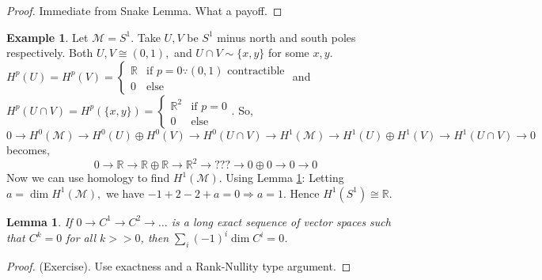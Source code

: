 \documentclass[10pt]{article}
\theoremstyle{plain}
\newtheorem{lemma}[thm]{Lemma}
\theoremstyle{definition}
\newtheorem{exmp}[thm]{Example} %
\newcommand{\Real}{\mathbb{R}}
\newcommand{\man}{\mathcal{M}}
\newcommand{\sumfromto}[2]{\sum\limits_{#1}^{#2}}
\newcommand{\cohomman}[1]{H^{#1}(\man)}
\newcommand{\UintV}{U\cap V}
\begin{document}
\begin{proof}
Immediate from Snake Lemma. What a payoff.
\end{proof}
\begin{exmp} Let $\man = S^1.$ Take $U,V$ be $S^1$ minus north and south poles respectively. Both $U, V \cong (0,1),$ and $\UintV \sim \{x,y\} $ for some $x,y$. $H^p(U) = H^p(V) = \begin{cases} \Real &\text{if } p = 0 \because (0,1) \text{ contractible} \\ 0 &\text{else} \end{cases}$ and $H^p(\UintV) = H^p(\{x,y\}) = \begin{cases} \Real^2&\text{if } p = 0 \\ 0 &\text{else} \end{cases}$. So, $$ 
0 \to \cohomman{0} \to H^0(U)\oplus H^0(V) \to H^0(\UintV) \to \cohomman{1} \to H^1(U)\oplus H^1(V) \to H^1(\UintV) \to 0
$$
becomes,
$$0 \to \Real \to \Real \oplus \Real \to \Real^2 \to ??? \to 0 \oplus 0 \to 0 \to 0$$
Now we can use homology to find $\cohomman{1}$. Using Lemma \ref{lemma:longexactsequencedimensionsum}: Letting $a =\dim \cohomman{1}, $ we have $-1 + 2 -2 + a = 0 \Rightarrow a = 1.$ Hence $H^1(S^1) \cong \Real$.
\end{exmp}
\begin{lemma}\label{lemma:longexactsequencedimensionsum}
If $0 \to C^1 \to C^2 \to \dots$ is a long exact sequence of vector spaces such that $C^k = 0 $ for all $k >>0$, then $\sumfromto{i}{} (-1)^i \dim C^i = 0 $.
\end{lemma}
\begin{proof}
(Exercise). Use exactness and a Rank-Nullity type argument.
\end{proof}
\end{document}
